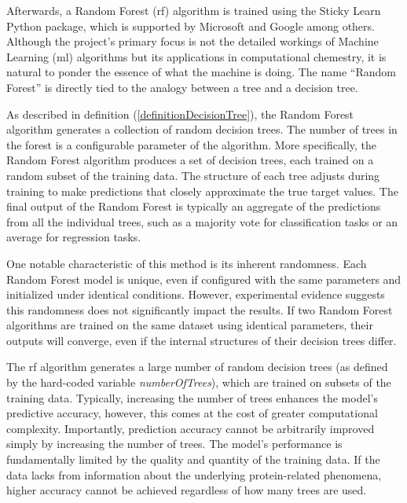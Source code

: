 \documentclass[11pt]{article}
\begin{document}
Afterwards, a Random Forest (\gls{rf}) algorithm is trained using the Sticky Learn \cite{PythonPackageStickitLearn} Python package, which is supported by Microsoft and Google among others. Although the project’s primary focus is not the detailed workings of Machine Learning (\gls{ml}) algorithms but its applications in computational chemestry, it is natural to ponder the essence of what the machine is doing. The name “Random Forest” is directly tied to the analogy between a tree and a decision tree. \par

As described in definition (\ref{definitionDecisionTree}), the Random Forest algorithm generates a collection of random decision trees. The number of trees in the forest is a configurable parameter of the algorithm. More specifically, the Random Forest algorithm produces a set of decision trees, each trained on a random subset of the training data. The structure of each tree adjusts during training to make predictions that closely approximate the true target values. The final output of the Random Forest is typically an aggregate of the predictions from all the individual trees, such as a majority vote for classification tasks or an average for regression tasks. \par

One notable characteristic of this method is its inherent randomness. Each Random Forest model is unique, even if configured with the same parameters and initialized under identical conditions. However, experimental evidence suggests this randomness does not significantly impact the results. If two Random Forest algorithms are trained on the same dataset using identical parameters, their outputs will converge, even if the internal structures of their decision trees differ.

The \gls{rf} algorithm generates a large number of random decision trees (as defined by the hard-coded variable \emph{numberOfTrees}), which are trained on subsets of the training data. Typically, increasing the number of trees enhances the model’s predictive accuracy, however, this comes at the cost of greater computational complexity. Importantly, prediction accuracy cannot be arbitrarily improved simply by increasing the number of trees. The model’s performance is fundamentally limited by the quality and quantity of the training data. If the data lacks from information about the underlying protein-related phenomena, higher accuracy cannot be achieved regardless of how many trees are used.
\end{document}
